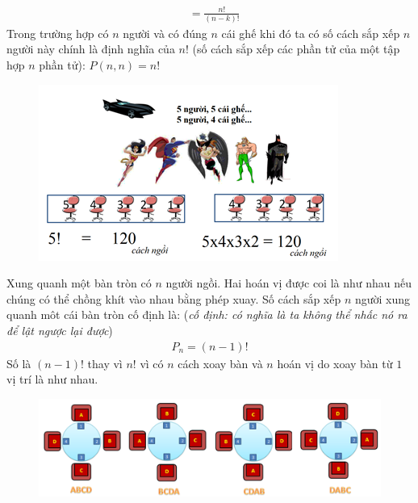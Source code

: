 \begin{multicols}{2}
\begin{align*}
		&= \frac{n!}{(n-k)!} 
	\end{align*}
	\vskip 0.1cm
	Trong trường hợp có $n$ người và có đúng $n$ cái ghế khi đó ta có số cách sắp xếp $n$ người này chính là định nghĩa của $n!$ (số cách sắp xếp các phần tử của một tập hợp $n$ phần tử): $P(n,n)=n!$
	\begin{figure}[H]
		\centering
		\vspace*{-10pt}
		\captionsetup{labelformat=empty, justification=centering}
		\includegraphics[width=1\linewidth]{_4}
		\vspace*{-15pt}
	\end{figure}
	 Xung quanh một bàn tròn có $n$ người ngồi. Hai hoán vị được coi là như nhau nếu chúng có thể chồng khít vào nhau bằng phép xuay. Số cách sắp xếp $n$ người xung quanh môt cái bàn tròn cố định là: (\textit{cố định: có nghĩa là ta không thể nhấc nó ra để lật ngược lại được})
	\begin{align*}
		P_n=(n-1)!
	\end{align*}
	Số là $(n-1)!$ thay vì $n!$ vì có $n$ cách xoay bàn và $n$ hoán vị do xoay bàn từ $1$ vị trí là như nhau.
	\begin{figure}[H]
		\centering
		\vspace*{5pt}
		\captionsetup{labelformat=empty, justification=centering}
		\includegraphics[width=1\linewidth]{_5}

\end{figure}
\end{multicols}

